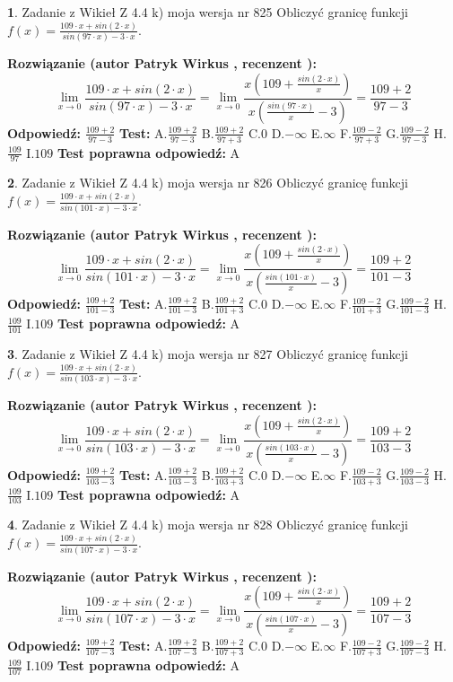\documentclass[12pt, a4paper]{article}
\theoremstyle{definition} %
\newtheorem{zad}{}
\newcommand{\zadStart}[1]{\begin{zad}#1\newline}
\newcommand{\zadStop}{\end{zad}}
\newcommand{\rozwStart}[2]{\noindent \textbf{Rozwiązanie (autor #1 , recenzent #2): }\newline}
\newcommand{\rozwStop}{\newline}
\newcommand{\odpStart}{\noindent \textbf{Odpowiedź:}\newline}
\newcommand{\odpStop}{\newline}
\newcommand{\testStart}{\noindent \textbf{Test:}\newline}
\newcommand{\testStop}{\newline}
\newcommand{\kluczStart}{\noindent \textbf{Test poprawna odpowiedź:}\newline}
\newcommand{\kluczStop}{\newline}
\begin{document}
\zadStart{Zadanie z Wikieł Z 4.4 k) moja wersja nr 825}
Obliczyć granicę funkcji $f(x)=\frac{109\cdot x +sin(2\cdot x)}{sin(97\cdot x) -3\cdot x}$.
\zadStop
\rozwStart{Patryk Wirkus}{}
$$\lim\limits_{x\to 0}\frac{109\cdot x +sin(2\cdot x)}{sin(97\cdot x) -3\cdot x}
=\lim\limits_{x\to 0}\frac{x(109+\frac{sin(2\cdot x)}{x})}{x(\frac{sin(97\cdot x)}{x}-3)}
=\frac{109+2}{97-3}$$
\rozwStop
\odpStart
$\frac{109+2}{97-3}$
\odpStop
\testStart
A.$\frac{109+2}{97-3}$
B.$\frac{109+2}{97+3}$
C.$0$
D.$-\infty$
E.$\infty$
F.$\frac{109-2}{97+3}$
G.$\frac{109-2}{97-3}$
H.$\frac{109}{97}$
I.$109$
\testStop
\kluczStart
A
\kluczStop



\zadStart{Zadanie z Wikieł Z 4.4 k) moja wersja nr 826}
Obliczyć granicę funkcji $f(x)=\frac{109\cdot x +sin(2\cdot x)}{sin(101\cdot x) -3\cdot x}$.
\zadStop
\rozwStart{Patryk Wirkus}{}
$$\lim\limits_{x\to 0}\frac{109\cdot x +sin(2\cdot x)}{sin(101\cdot x) -3\cdot x}
=\lim\limits_{x\to 0}\frac{x(109+\frac{sin(2\cdot x)}{x})}{x(\frac{sin(101\cdot x)}{x}-3)}
=\frac{109+2}{101-3}$$
\rozwStop
\odpStart
$\frac{109+2}{101-3}$
\odpStop
\testStart
A.$\frac{109+2}{101-3}$
B.$\frac{109+2}{101+3}$
C.$0$
D.$-\infty$
E.$\infty$
F.$\frac{109-2}{101+3}$
G.$\frac{109-2}{101-3}$
H.$\frac{109}{101}$
I.$109$
\testStop
\kluczStart
A
\kluczStop



\zadStart{Zadanie z Wikieł Z 4.4 k) moja wersja nr 827}
Obliczyć granicę funkcji $f(x)=\frac{109\cdot x +sin(2\cdot x)}{sin(103\cdot x) -3\cdot x}$.
\zadStop
\rozwStart{Patryk Wirkus}{}
$$\lim\limits_{x\to 0}\frac{109\cdot x +sin(2\cdot x)}{sin(103\cdot x) -3\cdot x}
=\lim\limits_{x\to 0}\frac{x(109+\frac{sin(2\cdot x)}{x})}{x(\frac{sin(103\cdot x)}{x}-3)}
=\frac{109+2}{103-3}$$
\rozwStop
\odpStart
$\frac{109+2}{103-3}$
\odpStop
\testStart
A.$\frac{109+2}{103-3}$
B.$\frac{109+2}{103+3}$
C.$0$
D.$-\infty$
E.$\infty$
F.$\frac{109-2}{103+3}$
G.$\frac{109-2}{103-3}$
H.$\frac{109}{103}$
I.$109$
\testStop
\kluczStart
A
\kluczStop



\zadStart{Zadanie z Wikieł Z 4.4 k) moja wersja nr 828}
Obliczyć granicę funkcji $f(x)=\frac{109\cdot x +sin(2\cdot x)}{sin(107\cdot x) -3\cdot x}$.
\zadStop
\rozwStart{Patryk Wirkus}{}
$$\lim\limits_{x\to 0}\frac{109\cdot x +sin(2\cdot x)}{sin(107\cdot x) -3\cdot x}
=\lim\limits_{x\to 0}\frac{x(109+\frac{sin(2\cdot x)}{x})}{x(\frac{sin(107\cdot x)}{x}-3)}
=\frac{109+2}{107-3}$$
\rozwStop
\odpStart
$\frac{109+2}{107-3}$
\odpStop
\testStart
A.$\frac{109+2}{107-3}$
B.$\frac{109+2}{107+3}$
C.$0$
D.$-\infty$
E.$\infty$
F.$\frac{109-2}{107+3}$
G.$\frac{109-2}{107-3}$
H.$\frac{109}{107}$
I.$109$
\testStop
\kluczStart
A
\kluczStop
\end{document}
